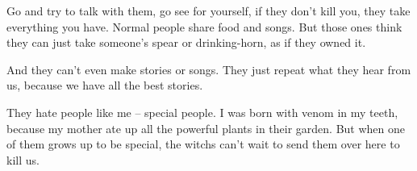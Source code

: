 \begin{multicols}{2}
\begin{exampletext}
Go and try to talk with them, go see for yourself, if they don't kill you, they take everything you have.
Normal people share food and songs.
But those ones think they can just take someone's spear or drinking-horn, as if they owned it.

And they can't even make stories or songs.
They just repeat what they hear from us, because we have all the best stories.

They hate people like me -- special people.
I was born with venom in my teeth, because my mother ate up all the powerful plants in their garden.
But when one of them grows up to be special, the \glspl{witch} can't wait to send them over here to kill us.

\end{exampletext}

\end{multicols}
